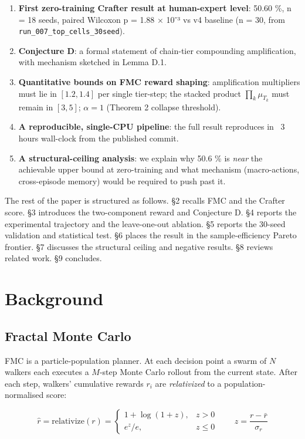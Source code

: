 \documentclass[11pt,letterpaper]{article}
\begin{document}
\begin{enumerate}
\item \textbf{First zero-training Crafter result at human-expert level}: 50.60 \%, n = 18 seeds, paired Wilcoxon p = 1.88 × 10⁻³ vs v4 baseline (n = 30, from \texttt{run\_007\_top\_cells\_30seed}).
\item \textbf{Conjecture D}: a formal statement of chain-tier compounding amplification, with mechanism sketched in Lemma D.1.
\item \textbf{Quantitative bounds on FMC reward shaping}: amplification multipliers must lie in $[1.2, 1.4]$ per single tier-step; the stacked product $\prod_k \mu_{T_k}$ must remain in $[3, 5]$; $\alpha = 1$ (Theorem 2 collapse threshold).
\item \textbf{A reproducible, single-CPU pipeline}: the full result reproduces in ~3 hours wall-clock from the published commit.
\item \textbf{A structural-ceiling analysis}: we explain why 50.6 \% is \emph{near} the achievable upper bound at zero-training and what mechanism (macro-actions, cross-episode memory) would be required to push past it.
\end{enumerate}
The rest of the paper is structured as follows. §2 recalls FMC and the
Crafter score. §3 introduces the two-component reward and Conjecture D.
§4 reports the experimental trajectory and the leave-one-out ablation.
§5 reports the 30-seed validation and statistical test. §6 places the
result in the sample-efficiency Pareto frontier. §7 discusses the
structural ceiling and negative results. §8 reviews related work. §9
concludes.



\section{Background}

\subsection{Fractal Monte Carlo}

FMC is a particle-population planner. At each decision point a swarm of
$N$ walkers each executes a $M$-step Monte Carlo rollout from the
current state. After each step, walkers' cumulative rewards $r_i$ are
\emph{relativized} to a population-normalised score:

\[
\widehat{r} = \mathrm{relativize}(r) =
\begin{cases}
1 + \log(1 + z), & z > 0 \\[2pt]
e^z / e, & z \le 0
\end{cases}
\qquad z = \frac{r - \bar r}{\sigma_r}
\]
\end{document}

